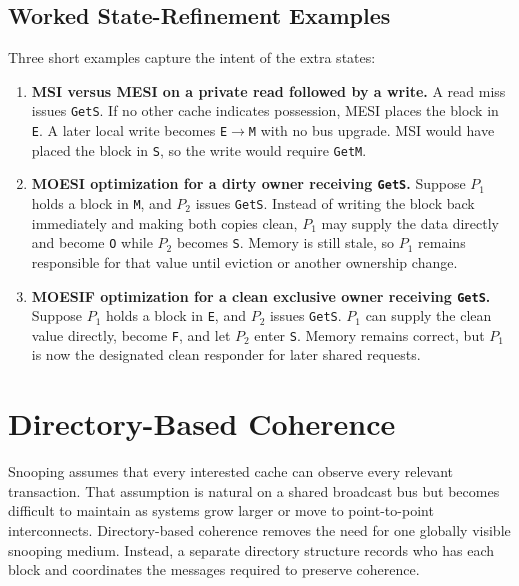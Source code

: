 \subsection*{Worked State-Refinement Examples}
Three short examples capture the intent of the extra states:
\begin{enumerate}
    \item \textbf{MSI versus MESI on a private read followed by a write.}
    A read miss issues \texttt{GetS}.
    If no other cache indicates possession, MESI places the block in \texttt{E}.
    A later local write becomes \texttt{E}$\rightarrow$\texttt{M} with no bus upgrade.
    MSI would have placed the block in \texttt{S}, so the write would require \texttt{GetM}.
    \item \textbf{MOESI optimization for a dirty owner receiving \texttt{GetS}.}
    Suppose $P_1$ holds a block in \texttt{M}, and $P_2$ issues \texttt{GetS}.
    Instead of writing the block back immediately and making both copies clean, $P_1$ may supply the data directly and become \texttt{O} while $P_2$ becomes \texttt{S}.
    Memory is still stale, so $P_1$ remains responsible for that value until eviction or another ownership change.
    \item \textbf{MOESIF optimization for a clean exclusive owner receiving \texttt{GetS}.}
    Suppose $P_1$ holds a block in \texttt{E}, and $P_2$ issues \texttt{GetS}. $P_1$ can supply the clean value directly, become \texttt{F}, and let $P_2$ enter \texttt{S}.
    Memory remains correct, but $P_1$ is now the designated clean responder for later shared requests.
\end{enumerate}


\section{Directory-Based Coherence}\label{sec:mp-directory}
Snooping assumes that every interested cache can observe every relevant transaction.
That assumption is natural on a shared broadcast bus but becomes difficult to maintain as systems grow larger or move to point-to-point interconnects.
Directory-based coherence removes the need for one globally visible snooping medium.
Instead, a separate directory structure records who has each block and coordinates the messages required to preserve coherence.

